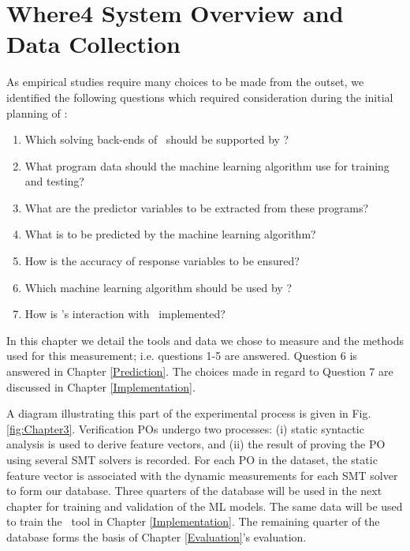 \chapter{Where4 System Overview and Data Collection}%
\thispagestyle{nohead}
\label{Experimental} %

As empirical studies require many choices to be made from the outset, we identified the following questions which required consideration during the initial planning of \where:

\begin{enumerate}
	\item Which solving back-ends of \why~should be supported by \where?
	\item What program data should the machine learning algorithm use for training and testing?
	\item What are the predictor variables to be extracted from these programs?
	\item What is to be predicted by the machine learning algorithm?
	\item How is the accuracy of response variables to be ensured?
	\item Which machine learning algorithm should be used by \where?
	\item How is \where's interaction with \why~implemented?   
\end{enumerate}   

In this chapter we detail the tools and data we chose to measure and the methods used for this measurement; i.e. questions 1-5 are answered. Question 6 is answered in Chapter \ref{Prediction}. The choices made in regard to Question 7 are discussed in Chapter \ref{Implementation}. 

A diagram illustrating this part of the experimental process is given in Fig. \ref{fig:Chapter3}. 
Verification POs undergo two processes: (i) static syntactic analysis is used to derive feature vectors, and (ii) the result of proving the PO using several SMT solvers is recorded. 
For each PO in the dataset, the static feature vector is associated with the dynamic measurements for each SMT solver to form our database.
Three quarters of the database will be used in the next chapter for training and validation of the ML models.
The same data will be used to train the \where~tool in Chapter \ref{Implementation}.
The remaining quarter of the database forms the basis of Chapter \ref{Evaluation}'s evaluation.
   
